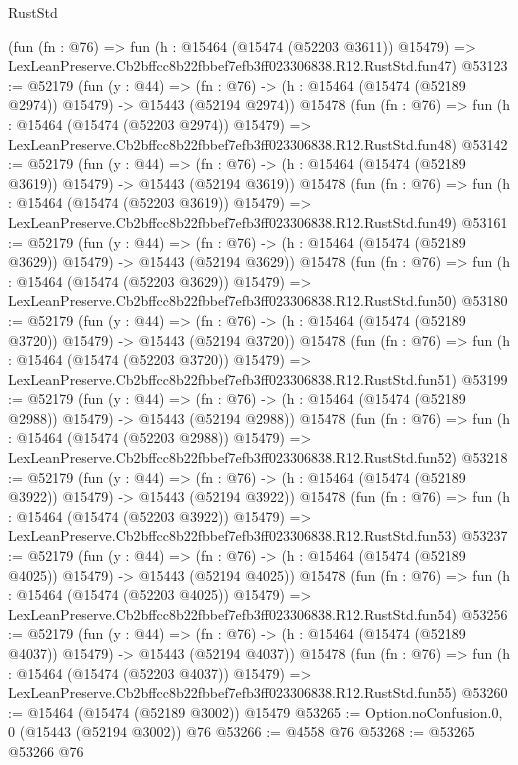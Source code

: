\begin{lexlean}{RustStd}
\begin{coremodule}
    (fun (fn : @76) =>
    fun (h : @15464 (@15474 (@52203 @3611)) @15479) =>
    LexLeanPreserve.Cb2bffcc8b22fbbef7efb3ff023306838.R12.RustStd.fun47)
@53123 := @52179
    (fun (y : @44) =>
    (fn : @76) -> (h : @15464 (@15474 (@52189 @2974)) @15479) -> @15443 (@52194 @2974))
    @15478
    (fun (fn : @76) =>
    fun (h : @15464 (@15474 (@52203 @2974)) @15479) =>
    LexLeanPreserve.Cb2bffcc8b22fbbef7efb3ff023306838.R12.RustStd.fun48)
@53142 := @52179
    (fun (y : @44) =>
    (fn : @76) -> (h : @15464 (@15474 (@52189 @3619)) @15479) -> @15443 (@52194 @3619))
    @15478
    (fun (fn : @76) =>
    fun (h : @15464 (@15474 (@52203 @3619)) @15479) =>
    LexLeanPreserve.Cb2bffcc8b22fbbef7efb3ff023306838.R12.RustStd.fun49)
@53161 := @52179
    (fun (y : @44) =>
    (fn : @76) -> (h : @15464 (@15474 (@52189 @3629)) @15479) -> @15443 (@52194 @3629))
    @15478
    (fun (fn : @76) =>
    fun (h : @15464 (@15474 (@52203 @3629)) @15479) =>
    LexLeanPreserve.Cb2bffcc8b22fbbef7efb3ff023306838.R12.RustStd.fun50)
@53180 := @52179
    (fun (y : @44) =>
    (fn : @76) -> (h : @15464 (@15474 (@52189 @3720)) @15479) -> @15443 (@52194 @3720))
    @15478
    (fun (fn : @76) =>
    fun (h : @15464 (@15474 (@52203 @3720)) @15479) =>
    LexLeanPreserve.Cb2bffcc8b22fbbef7efb3ff023306838.R12.RustStd.fun51)
@53199 := @52179
    (fun (y : @44) =>
    (fn : @76) -> (h : @15464 (@15474 (@52189 @2988)) @15479) -> @15443 (@52194 @2988))
    @15478
    (fun (fn : @76) =>
    fun (h : @15464 (@15474 (@52203 @2988)) @15479) =>
    LexLeanPreserve.Cb2bffcc8b22fbbef7efb3ff023306838.R12.RustStd.fun52)
@53218 := @52179
    (fun (y : @44) =>
    (fn : @76) -> (h : @15464 (@15474 (@52189 @3922)) @15479) -> @15443 (@52194 @3922))
    @15478
    (fun (fn : @76) =>
    fun (h : @15464 (@15474 (@52203 @3922)) @15479) =>
    LexLeanPreserve.Cb2bffcc8b22fbbef7efb3ff023306838.R12.RustStd.fun53)
@53237 := @52179
    (fun (y : @44) =>
    (fn : @76) -> (h : @15464 (@15474 (@52189 @4025)) @15479) -> @15443 (@52194 @4025))
    @15478
    (fun (fn : @76) =>
    fun (h : @15464 (@15474 (@52203 @4025)) @15479) =>
    LexLeanPreserve.Cb2bffcc8b22fbbef7efb3ff023306838.R12.RustStd.fun54)
@53256 := @52179
    (fun (y : @44) =>
    (fn : @76) -> (h : @15464 (@15474 (@52189 @4037)) @15479) -> @15443 (@52194 @4037))
    @15478
    (fun (fn : @76) =>
    fun (h : @15464 (@15474 (@52203 @4037)) @15479) =>
    LexLeanPreserve.Cb2bffcc8b22fbbef7efb3ff023306838.R12.RustStd.fun55)
@53260 := @15464 (@15474 (@52189 @3002)) @15479
@53265 := Option.noConfusion.{0, 0} (@15443 (@52194 @3002)) @76
@53266 := @4558 @76
@53268 := @53265 @53266 @76

\end{coremodule}
\end{lexlean}
